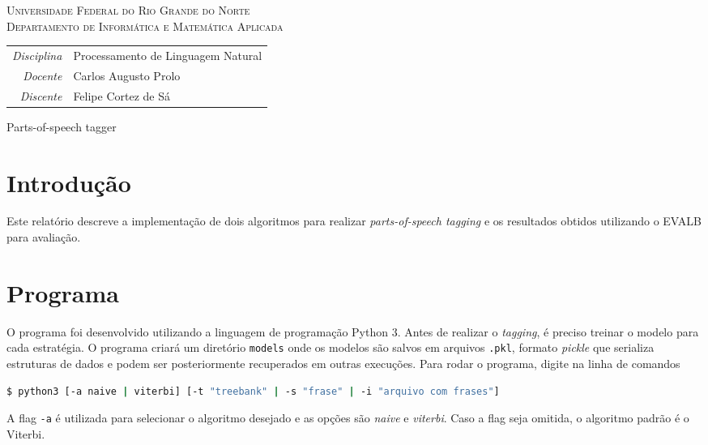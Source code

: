 \message{ !name(relatorio.tex)}\documentclass[12pt, a4paper]{article}
\newcommand{\code}[1]{{\lstinline{#1}}}
\begin{document}

\begin{center}
    \textsc{Universidade Federal do Rio Grande do Norte} \\
    \textsc{Departamento de Informática e Matemática Aplicada}
\end{center}

\bigskip

\begin{tabular}{@{}rl@{}}
    \emph{Disciplina} & Processamento de Linguagem Natural \\
    \emph{Docente}    & Carlos Augusto Prolo \\
    \emph{Discente}   & Felipe Cortez de Sá \\
\end{tabular}

\bigskip

\begin{center}
\large Parts-of-speech tagger
\end{center}

\section{Introdução}
Este relatório descreve a implementação de dois algoritmos para realizar
\emph{parts-of-speech tagging} e os resultados obtidos utilizando o EVALB para
avaliação. 

\section{Programa}
O programa foi desenvolvido utilizando a linguagem de programação Python 3.
Antes de realizar o \emph{tagging}, é preciso treinar o modelo para cada
estratégia. O programa criará um diretório \code{models} onde os modelos são
salvos em arquivos \code{.pkl}, formato \emph{pickle} que serializa estruturas
de dados e podem ser posteriormente recuperados em outras execuções. Para rodar
o programa, digite na linha de comandos

\begin{lstlisting}[language=bash]
$ python3 [-a naive | viterbi] [-t "treebank" | -s "frase" | -i "arquivo com frases"]
\end{lstlisting}

A flag \code{-a} é utilizada para selecionar o algoritmo desejado e as opções
são \emph{naive} e \emph{viterbi}. Caso a flag seja omitida, o algoritmo
padrão é o Viterbi.
\end{document}
